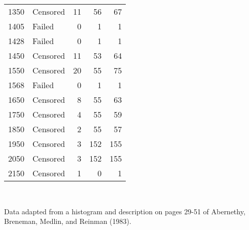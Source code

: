 \begin{table}
\begin{tabular}{rlrrr}
1350&Censored&11&56&67\\
1405&Failed&0&1&1\\
1428&Failed&0&1&1\\
1450&Censored&11&53&64\\
1550&Censored&20&55&75\\
1568&Failed&0&1&1\\
1650&Censored&8&55&63\\
1750&Censored&4&55&59\\
1850&Censored&2&55&57\\
1950&Censored&3&152&155\\
2050&Censored&3&152&155\\
2150&Censored&1&0&1\\
\hline
\end{tabular}\\
\begin{minipage}[t]{4in}
Data adapted from a histogram and description
on pages 29-51 of Abernethy, Breneman, Medlin, and Reinman (1983).
\end{minipage}
\label{atable:bleed.data}
\end{table}

